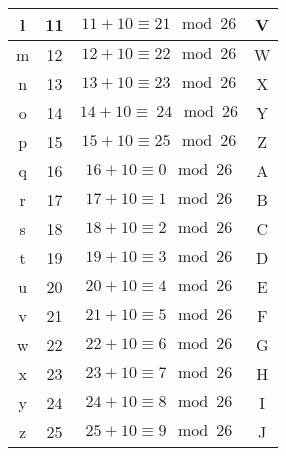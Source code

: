 \documentclass[10pt,a4paper]{article}
\begin{document}
\begin{table}[htdp]
\begin{center}
\begin{tabular}{|c|c|c|c|}
	l & 11 & \begin{math} 11+ 10 \equiv 21 \mod 26 \end{math}  & V \\ \hline
	m & 12 & \begin{math} 12 + 10 \equiv 22 \mod 26 \end{math} & W \\ \hline
	n & 13 & \begin{math} 13 + 10 \equiv 23 \mod 26 \end{math} & X \\ \hline
	o & 14 & \begin{math} 14 + 10 \equiv\ 24 \mod 26 \end{math} & Y \\ \hline
	p & 15 & \begin{math} 15 + 10 \equiv 25 \mod 26 \end{math} & Z \\ \hline
	q & 16 & \begin{math} 16 + 10 \equiv 0 \mod 26 \end{math} & A \\ \hline
	r & 17 & \begin{math} 17 + 10 \equiv 1 \mod 26 \end{math}  & B \\ \hline
	s & 18 & \begin{math} 18 + 10 \equiv 2 \mod 26 \end{math} & C \\ \hline
	t & 19 & \begin{math} 19 + 10 \equiv 3 \mod 26 \end{math} & D \\ \hline
	u & 20 & \begin{math} 20 + 10 \equiv 4 \mod 26 \end{math} & E \\ \hline
	v & 21 & \begin{math} 21 + 10 \equiv 5 \mod 26 \end{math} & F \\ \hline
	w & 22 & \begin{math} 22 + 10 \equiv 6 \mod 26 \end{math} & G \\ \hline
	x & 23 & \begin{math} 23 + 10 \equiv 7 \mod 26 \end{math}  & H \\ \hline
	y & 24 & \begin{math} 24 + 10 \equiv 8 \mod 26 \end{math} & I \\ \hline
	z & 25 & \begin{math} 25 + 10 \equiv 9 \mod 26 \end{math} & J \\ \hline
\end{tabular}
\end{center}
\label{tbl:alphabet}
\end{table}%
\end{document}
